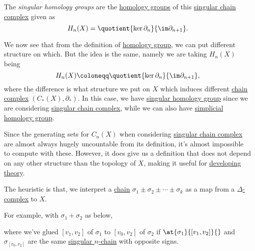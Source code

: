 \begin{definition}\label{def:singular-homology-group}
	The \emph{singular homology groups} are the \hyperref[def:homology-group]{homology groups} of this \hyperref[def:singular-chain-complex]{singular chain complex}
	given as
	\[
		H_n(X) = \quotient{\ker \partial_n}{\im \partial_{n + 1}}.
	\]
\end{definition}
\begin{remark}
	We now see that from the definition of \hyperref[def:homology-group]{homology group}, we can put different structure on which.
	But the idea is the same, namely we are taking \(H_{n} (X)\) being
	\[
		H_n(X) \coloneqq \quotient{\ker \partial _n}{\im \partial _{n+1}},
	\]
	where the difference is what structure we put on \(X\) which induces different \hyperref[def:chain-complex]{chain complex} \((C_{\ast} (X), \partial _\ast)\).
	In this case, we have \hyperref[def:singular-homology-group]{singular homology group} since we are considering
	\hyperref[def:singular-chain-complex]{singular chain complex}, while we can also have
	\hyperref[def:simplicial-homology-group]{simplicial homology group}.
\end{remark}

Since the generating sets for \(C_{n} (X)\) when considering \hyperref[def:singular-chain-complex]{singular chain complex} are almost
always hugely uncountable from its definition, it's almost impossible to compute with these. However, it does give us a definition
that does not depend on any other structure than the topology of \(X\), making it useful for \underline{developing theory}.

\begin{note}
	The heuristic is that, we interpret a \hyperref[def:chain-group]{chain} \(\sigma_1 \pm \sigma_2 \pm \cdots \pm \sigma_k\) as a
	map from a \hyperref[def:delta-complex]{\(\Delta\)-complex} to \(X\).

	\begin{eg}
		For example, with \(\sigma_1 + \sigma_2\) as below,
		\begin{figure}[H]
			\centering
			\label{fig:note:chain-as-a-map}
		\end{figure}
		where we've glued \([v_1, v_2]\) of \(\sigma_1\) to \([v_0, v_2]\) of \(\sigma_2\) if \(\at{\sigma_1}{[v_1, v_2]}{}\) and
		\(\sigma_{[v_0, v_2]}\) are the same \hyperref[def:singular-chain-group]{singular \(n\)-chain} with opposite signs.
	\end{eg}
\end{note}

